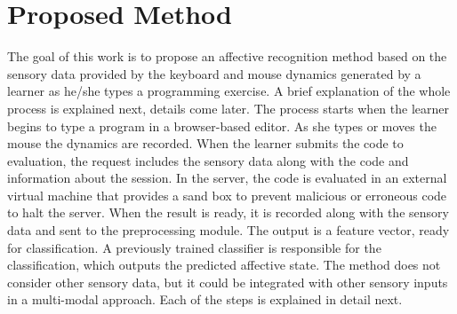 \documentclass[a4paper,twoside]{article}
\begin{document}
\section{Proposed Method}
\label{sec:method}

The goal of this work is to propose an affective
recognition method based on the sensory data provided by the keyboard and mouse
dynamics generated by a learner as he/she types a programming exercise. A brief explanation of the
whole process is explained next, details come later. The process starts when the
learner begins to type a program in a browser-based editor. As she types or
moves the mouse the dynamics are recorded. When the learner submits the code to
evaluation, the request includes the sensory data along with the code and
information about the session. In the server, the code is evaluated in an
external virtual machine that provides a sand box to prevent malicious or
erroneous code to halt the server. When the result is ready, it is recorded
along with the sensory data and sent to the preprocessing module. The output is
a feature vector, ready for classification. A previously trained classifier is
responsible for the classification, which outputs the predicted affective state.
The method does not consider other sensory data, but it could be integrated with
other sensory inputs in a multi-modal approach.  Each of the steps is explained
in detail next.
\end{document}
